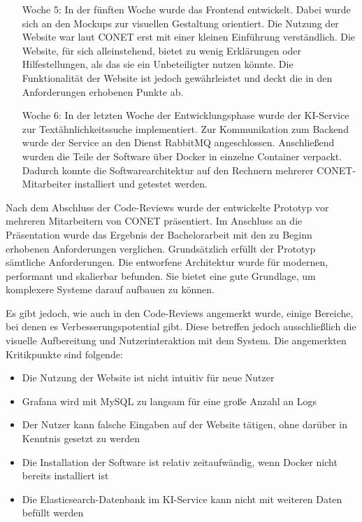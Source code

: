 \begin{itemize}[leftmargin=6em]
\item [Woche 5:] In der fünften Woche wurde das Frontend entwickelt. Dabei wurde sich an den Mockups zur visuellen Gestaltung orientiert. Die Nutzung der Website war laut CONET erst mit einer kleinen Einführung verständlich. Die Website, für sich alleinstehend, bietet zu wenig Erklärungen oder Hilfestellungen, als das sie ein Unbeteiligter nutzen könnte. Die Funktionalität der Website ist jedoch gewährleistet und deckt die in den Anforderungen erhobenen Punkte ab.
\item [Woche 6:] In der letzten Woche der Entwicklungsphase wurde der KI-Service zur Textähnlichkeitssuche implementiert. Zur Kommunikation zum Backend wurde der Service an den Dienst RabbitMQ angeschlossen. Anschließend wurden die Teile der Software über Docker in einzelne Container verpackt. Dadurch konnte die Softwarearchitektur auf den Rechnern mehrerer CONET-Mitarbeiter installiert und getestet werden.
\end{itemize}

Nach dem Abschluss der Code-Reviews wurde der entwickelte Prototyp vor mehreren Mitarbeitern von CONET präsentiert. Im Anschluss an die Präsentation wurde das Ergebnis der Bachelorarbeit mit den zu Beginn erhobenen Anforderungen verglichen. Grundsätzlich erfüllt der Prototyp sämtliche Anforderungen. Die entworfene Architektur wurde für modernen, performant und skalierbar befunden. Sie bietet eine gute Grundlage, um komplexere Systeme darauf aufbauen zu können.

Es gibt jedoch, wie auch in den Code-Reviews angemerkt wurde, einige Bereiche, bei denen es Verbesserungspotential gibt. Diese betreffen jedoch ausschließlich die visuelle Aufbereitung und Nutzerinteraktion mit dem System. Die angemerkten Kritikpunkte sind folgende:

\begin{itemize}
\item Die Nutzung der Website ist nicht intuitiv für neue Nutzer
\item Grafana wird mit MySQL zu langsam für eine große Anzahl an Logs
\item Der Nutzer kann falsche Eingaben auf der Website tätigen, ohne darüber in Kenntnis gesetzt zu werden
\item Die Installation der Software ist relativ zeitaufwändig, wenn Docker nicht bereits installiert ist
\item Die Elasticsearch-Datenbank im KI-Service kann nicht mit weiteren Daten befüllt werden
\end{itemize}
  